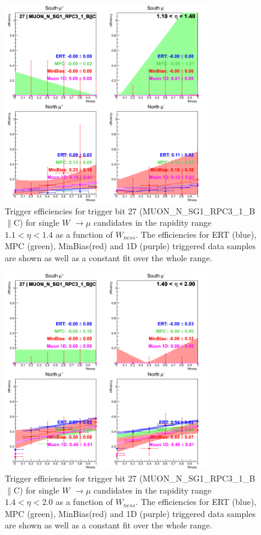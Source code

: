 \begin{figure}[ht]
\begin{center}
\includegraphics[width=0.8\textwidth]{./figures/run13_trigeffisn_eta0_trig27_lin.png}
\caption{\label{fig:run13_trigeffisn_eta0_nper0_trig27_lin} Trigger efficiencies for trigger bit 27 (MUON\_N\_SG1\_RPC3\_1\_B$\|$C) for single $W$ $\rightarrow \mu$ candidates in the rapidity range $ 1.1 < \eta < 1.4$ as a function of $W_{ness}$. The efficiencies for ERT (blue), MPC (green), MinBias(red) and 1D (purple) triggered data samples are shown as well as a constant fit over the whole range.}
\end{center}
\end{figure}
\begin{figure}[ht]
\begin{center}
\includegraphics[width=0.8\textwidth]{./figures/run13_trigeffisn_eta1_trig27_lin.png}
\caption{\label{fig:run13_trigeffisn_eta1_nper0_trig27_lin} Trigger efficiencies for trigger bit 27 (MUON\_N\_SG1\_RPC3\_1\_B$\|$C) for single $W$ $\rightarrow \mu$ candidates in the rapidity range $ 1.4 < \eta < 2.0$ as a function of $W_{ness}$. The efficiencies for ERT (blue), MPC (green), MinBias(red) and 1D (purple) triggered data samples are shown as well as a constant fit over the whole range.}
\end{center}
\end{figure}
\clearpage

